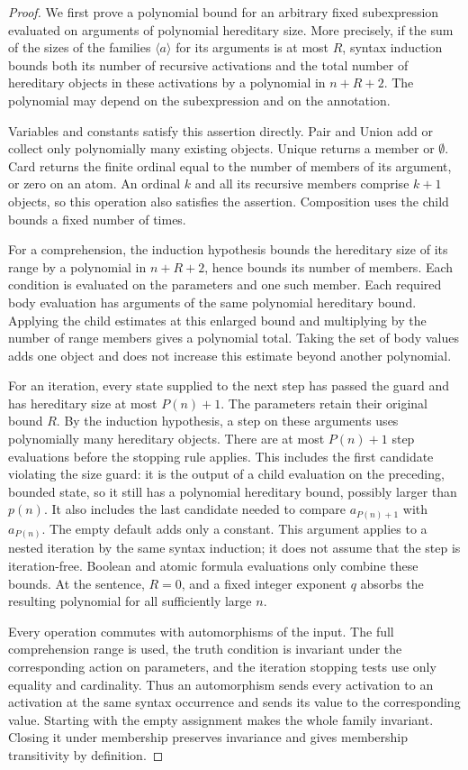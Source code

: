 \begin{proof}
We first prove a polynomial bound for an arbitrary fixed subexpression
evaluated on arguments of polynomial hereditary size.  More precisely,
if the sum of the sizes of the families \(\langle a\rangle\) for its
arguments is at most \(R\), syntax induction bounds both its number of
recursive activations and the total number of hereditary objects in
these activations by a polynomial in \(n+R+2\).  The polynomial may depend
on the subexpression and on the annotation.

Variables and constants satisfy this assertion directly.  Pair and Union
add or collect only polynomially many existing objects.  Unique returns
a member or \(\emptyset\).  Card returns the finite ordinal equal to the
number of members of its argument, or zero on an atom.  An ordinal \(k\)
and all its recursive members comprise \(k+1\) objects, so this operation
also satisfies the assertion.  Composition uses the child bounds a fixed
number of times.

For a comprehension, the induction hypothesis bounds the hereditary size
of its range by a polynomial in \(n+R+2\), hence bounds its number of
members.  Each condition is evaluated on the parameters and one such
member.  Each required body evaluation has arguments of the same
polynomial hereditary bound.  Applying the child estimates at this
enlarged bound and multiplying by the number of range members gives a
polynomial total.  Taking the set of body values adds one object and
does not increase this estimate beyond another polynomial.

For an iteration, every state supplied to the next step has passed the
guard and has hereditary size at most \(P(n)+1\).  The parameters retain
their original bound \(R\).  By the induction hypothesis, a step on these
arguments uses polynomially many hereditary objects.  There are at most
\(P(n)+1\) step evaluations before the stopping rule applies.  This
includes the first candidate violating the size guard: it is the output
of a child evaluation on the preceding, bounded state, so it still has
a polynomial hereditary bound, possibly larger than \(p(n)\).
It also includes the last candidate needed to compare
\(a_{P(n)+1}\) with \(a_{P(n)}\).  The empty default adds only a constant.
This argument applies to a nested iteration by the same syntax
induction; it does not assume that the step is iteration-free.
Boolean and atomic formula evaluations only combine these bounds.
At the sentence, \(R=0\), and a fixed integer exponent \(q\) absorbs the
resulting polynomial for all sufficiently large \(n\).

Every operation commutes with automorphisms of the input.  The full
comprehension range is used, the truth condition is invariant under the
corresponding action on parameters, and the iteration stopping tests use
only equality and cardinality.  Thus an automorphism sends every
activation to an activation at the same syntax occurrence and sends its
value to the corresponding value.  Starting with the empty assignment
makes the whole family invariant.  Closing it under membership preserves
invariance and gives membership transitivity by definition.
\end{proof}

